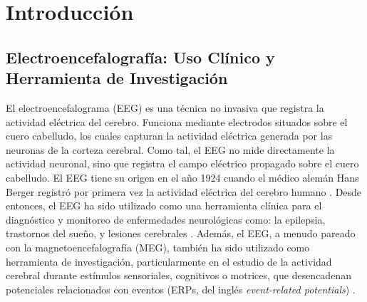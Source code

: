 %
\chapter{Introducción}
\label{sec:intro}






\section{Electroencefalografía: Uso Clínico y Herramienta de Investigación}
\label{sec:intro:eeg}

El electroencefalograma (EEG) es una técnica no invasiva que registra la actividad eléctrica del cerebro.
Funciona mediante electrodos situados sobre el cuero cabelludo, los cuales capturan la actividad eléctrica generada por las neuronas de la corteza cerebral.
Como tal, el EEG no mide directamente la actividad neuronal, sino que registra el campo eléctrico propagado sobre el cuero cabelludo.
El EEG tiene su origen en el año 1924 cuando el médico alemán Hans Berger registró por primera vez la actividad eléctrica del cerebro humano \cite{bergerUeberElektrenkephalogrammMenschen1929}.
Desde entonces, el EEG ha sido utilizado como una herramienta clínica para el diagnóstico y monitoreo de enfermedades neurológicas como: la epilepsia, trastornos del sueño, y lesiones cerebrales \cite{niedermeyerElectroencephalographyBasicPrinciples2005}.
Además, el EEG, a menudo pareado con la magnetoencefalografía (MEG), también ha sido utilizado como herramienta de investigación, particularmente en el estudio de la actividad cerebral durante estímulos sensoriales, cognitivos o motrices, que desencadenan potenciales relacionados con eventos (ERPs, del inglés \emph{event-related potentials}) \cite{luckIntroductionEventrelatedPotential2014}.

